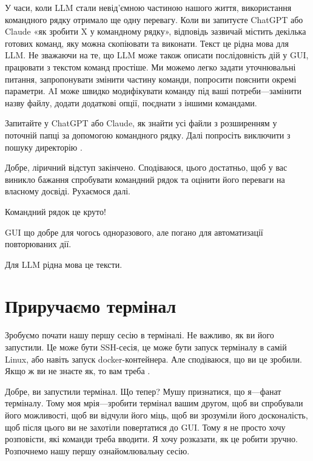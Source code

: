 У часи, коли LLM стали невід'ємною частиною нашого життя,
використання командного рядку отримало ще одну перевагу.
Коли ви запитуєте ChatGPT або Claude «як зробити X у командному рядку»,
відповідь зазвичай містить декілька готових команд, яку можна скопіювати та виконати.
Текст це рідна мова для LLM.
Не зважаючи на те, що LLM може також описати послідовність дій у GUI,
працювати з текстом команд простіше.
Ми можемо легко задати уточнювальні питання,
запропонувати змінити частину команди,
попросити пояснити окремі параметри.
AI може швидко модифікувати команду під ваші потреби---замінити назву файлу,
додати додаткові опції, поєднати з іншими командами.

\begin{exercise}
Запитайте у ChatGPT або Claude, як знайти усі файли з розширенням 
у поточній папці за допомогою командного рядку.
Далі попросіть виключити з пошуку директорію .
\end{exercise}

Добре, ліричний відступ закінчено.
Сподіваюся, цього достатньо, щоб у вас виникло бажання
спробувати командний рядок та оцінити його переваги на власному досвіді.
Рухаємося далі.

\begin{summary}
\item Командний рядок це круто!
\item GUI що добре для чогось одноразового, але погано для автоматизації повторюваних дії.
\item Для LLM рідна мова це тексти.
\end{summary}

\section{Приручаємо термінал}

Зробуємо почати нашу першу сесію в терміналі.
Не важливо, як ви його запустили.
Це може бути SSH-сесія, це може бути запуск терміналу в самій Linux, або навіть запуск docker-контейнера.
Але сподіваюся, що ви це зробили.
Якщо ж ви не знаєте як, то вам треба .

Добре, ви запустили термінал.
Що тепер?
Мушу признатися, що я---фанат терміналу.
Тому моя мрія---зробити термінал вашим другом,
щоб ви спробували його можливості,
щоб ви відчули його міць,
щоб ви зрозуміли його досконалість,
щоб після цього ви не захотіли повертатися до GUI.
Тому я не просто хочу розповісти, які команди треба вводити.
Я хочу розказати, як це робити зручно.
Розпочнемо нашу першу ознайомлювальну сесію.

